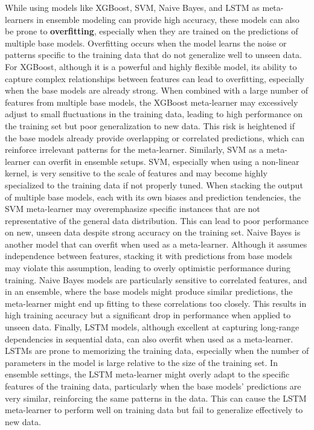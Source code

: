 \noindent
While using models like XGBoost, SVM, Naive Bayes, and LSTM as meta-learners in ensemble modeling can provide high accuracy, these models can also be prone to \textbf{overfitting}, especially when they are trained on the predictions of multiple base models. Overfitting occurs when the model learns the noise or patterns specific to the training data that do not generalize well to unseen data. For XGBoost, although it is a powerful and highly flexible model, its ability to capture complex relationships between features can lead to overfitting, especially when the base models are already strong. When combined with a large number of features from multiple base models, the XGBoost meta-learner may excessively adjust to small fluctuations in the training data, leading to high performance on the training set but poor generalization to new data. This risk is heightened if the base models already provide overlapping or correlated predictions, which can reinforce irrelevant patterns for the meta-learner. Similarly, SVM as a meta-learner can overfit in ensemble setups. SVM, especially when using a non-linear kernel, is very sensitive to the scale of features and may become highly specialized to the training data if not properly tuned. When stacking the output of multiple base models, each with its own biases and prediction tendencies, the SVM meta-learner may overemphasize specific instances that are not representative of the general data distribution. This can lead to poor performance on new, unseen data despite strong accuracy on the training set. Naive Bayes is another model that can overfit when used as a meta-learner. Although it assumes independence between features, stacking it with predictions from base models may violate this assumption, leading to overly optimistic performance during training. Naive Bayes models are particularly sensitive to correlated features, and in an ensemble, where the base models might produce similar predictions, the meta-learner might end up fitting to these correlations too closely. This results in high training accuracy but a significant drop in performance when applied to unseen data. Finally, LSTM models, although excellent at capturing long-range dependencies in sequential data, can also overfit when used as a meta-learner. LSTMs are prone to memorizing the training data, especially when the number of parameters in the model is large relative to the size of the training set. In ensemble settings, the LSTM meta-learner might overly adapt to the specific features of the training data, particularly when the base models' predictions are very similar, reinforcing the same patterns in the data. This can cause the LSTM meta-learner to perform well on training data but fail to generalize effectively to new data.

